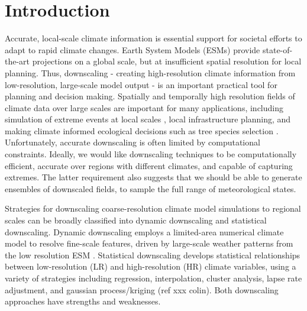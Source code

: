 \documentclass{ametsocV6.1}
\begin{document}

\section{Introduction}
Accurate, local-scale climate information is essential support for societal efforts to adapt to rapid climate changes. Earth System Models (ESMs) provide state-of-the-art projections on a global scale, but at insufficient spatial resolution for local planning. Thus, downscaling - creating high-resolution climate information from low-resolution, large-scale model output - is an important practical tool for planning and decision making. Spatially and temporally high resolution fields of climate data over large scales are important for many applications, including simulation of extreme events at local scales \citep[e.g. fires, floods, storms;][]{fischer2021increasing}, local infrastructure planning, and making climate informed ecological decisions such as tree species selection \citep{mackenzie2021ecological}. Unfortunately, accurate downscaling is often limited by computational constraints. Ideally, we would like downscaling techniques to be computationally efficient, accurate over regions with different climates, and capable of capturing extremes. The latter requirement also suggests that we should be able to generate ensembles of downscaled fields, to sample the full range of meteorological states.

Strategies for downscaling coarse-resolution climate model simulations to regional scales can be broadly classified into dynamic downscaling and statistical downscaling. Dynamic downscaling employs a limited-area numerical climate model to resolve fine-scale features,  driven by large-scale weather patterns from the low resolution ESM \citep{skamarock2001prototypes}. Statistical downscaling develops statistical relationships between low-resolution (LR) and high-resolution (HR) climate variables, using a variety of strategies including regression, interpolation, cluster analysis, lapse rate adjustment, and gaussian process/kriging (ref xxx colin). Both downscaling approaches have strengths and weaknesses. 
\end{document}
